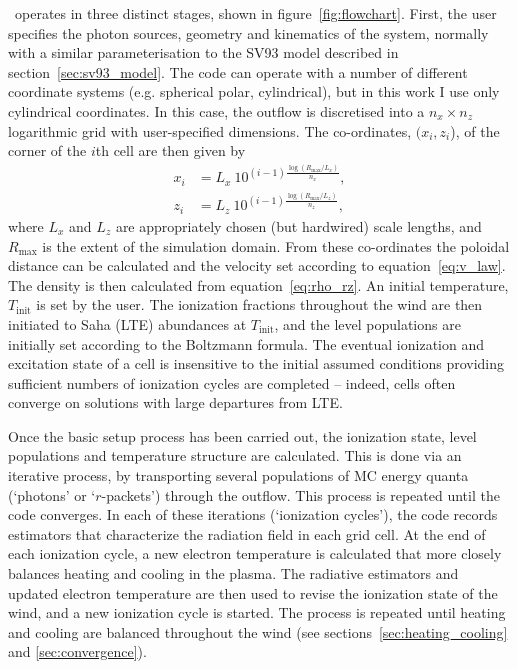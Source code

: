 \py\ operates in three distinct stages, shown in figure~\ref{fig:flowchart}. 
First, the user specifies the photon sources,
geometry and kinematics of the system, normally with a similar parameterisation
to the SV93 model described in section~\ref{sec:sv93_model}. 
The code can operate with a number of different coordinate systems 
(e.g. spherical polar, cylindrical), but in this work I use only cylindrical coordinates.
In this case, the outflow is discretised into a $n_x \times n_z$ logarithmic grid with 
user-specified dimensions. The co-ordinates, $(x_i, z_i$), 
of the corner of the $i$th cell are then given by
\begin{align}
x_i &= L_{x}~10^{(i-1)\frac{\log (R_{\mathrm{max}} / L_{x})}{n_x}},\\
z_i &= L_{z}~10^{(i-1)\frac{\log (R_{\mathrm{max}} / L_{z})}{n_z}},
\end{align}
where $L_x$ and $L_z$ are appropriately chosen (but hardwired) scale lengths, and $R_{\mathrm{max}}$ 
is the extent of the simulation domain.
From these co-ordinates the poloidal distance can be calculated and
the velocity set according to equation~\ref{eq:v_law}. The density
is then calculated from equation~\ref{eq:rho_rz}. An initial temperature,
$T_{\mathrm{init}}$ is set by the user. The ionization fractions throughout
the wind are then initiated to Saha (LTE) abundances at $T_{\mathrm{init}}$, and the level 
populations are initially set according to the Boltzmann formula. The eventual
ionization and excitation state of a cell is insensitive to the initial assumed 
conditions providing sufficient numbers of ionization cycles are completed -- 
indeed, cells often converge on solutions with large departures from LTE.

Once the basic setup process has been carried out, the ionization state,
level populations and temperature structure are calculated.
This is done via an iterative process, by transporting several populations of 
MC energy quanta (`photons' or `$r$-packets') through the outflow.
This process is repeated until the code converges. 
In each of these iterations (`ionization cycles'), the code records estimators that 
characterize the radiation field in each grid cell. At the end 
of each ionization cycle, a new electron temperature is calculated
that more closely balances heating and cooling in the 
plasma. The radiative estimators and updated electron
temperature are then used to revise the ionization state of the wind,
and a new ionization cycle is started. The process is repeated until
heating and cooling are balanced throughout the wind (see sections~\ref{sec:heating_cooling}
and \ref{sec:convergence}). 

